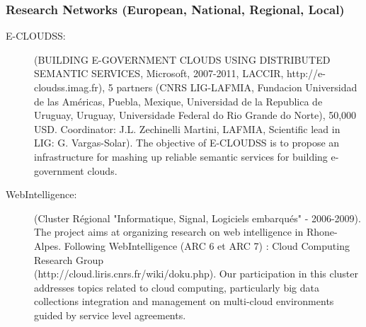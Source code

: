 \subsubsection{Research Networks (European, National, Regional, Local)}

\begin{description}

\item[E-CLOUDSS:] (BUILDING E-GOVERNMENT CLOUDS USING DISTRIBUTED SEMANTIC SERVICES, Microsoft, 2007-2011, LACCIR, http://e-cloudss.imag.fr), 5 partners (CNRS LIG-LAFMIA, Fundacion Universidad de las Am{\'e}ricas, Puebla, Mexique, Universidad de la Republica de Uruguay, Uruguay, Universidade Federal do Rio Grande do Norte), 50,000 USD. Coordinator: J.L. Zechinelli Martini, LAFMIA, Scientific lead in LIG: G. Vargas-Solar). The objective of E-CLOUDSS is to propose an infrastructure for mashing up reliable semantic services for building e-government clouds. 

\item[WebIntelligence:] (Cluster R{\'e}gional "Informatique, Signal, Logiciels embarqu{\'e}s" - 2006-2009). The project aims at organizing research on web intelligence in Rhone-Alpes.  Following  WebIntelligence (ARC 6 et ARC 7) : Cloud Computing Research Group \\
(http://cloud.liris.cnrs.fr/wiki/doku.php). Our participation in this  cluster addresses topics related to cloud computing, particularly big data collections integration and management on
multi-cloud environments guided by service level agreements. 


\end{description}
